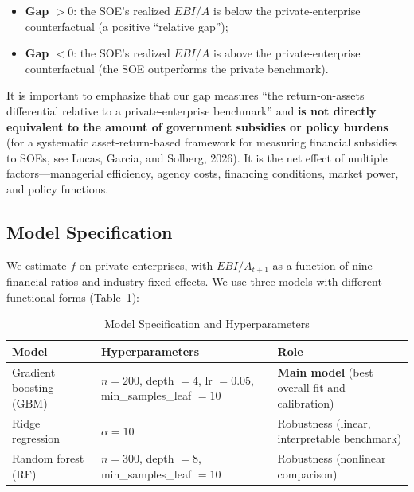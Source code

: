 \documentclass[11pt,a4paper]{article}
\begin{document}
\begin{itemize}[leftmargin=2em,itemsep=0pt]
\item \textbf{Gap $>0$}: the SOE's realized $EBI/A$ is below the private-enterprise counterfactual (a positive ``relative gap'');
\item \textbf{Gap $<0$}: the SOE's realized $EBI/A$ is above the private-enterprise counterfactual (the SOE outperforms the private benchmark).
\end{itemize}

It is important to emphasize that our gap measures ``the return-on-assets differential relative to a private-enterprise benchmark'' and \textbf{is not directly equivalent to the amount of government subsidies or policy burdens} (for a systematic asset-return-based framework for measuring financial subsidies to SOEs, see Lucas, Garcia, and Solberg, 2026). It is the net effect of multiple factors---managerial efficiency, agency costs, financing conditions, market power, and policy functions.

\subsection{Model Specification}

We estimate $f$ on private enterprises, with $EBI/A_{t+1}$ as a function of nine financial ratios and industry fixed effects. We use three models with different functional forms (Table~\ref{tab:models}):

\begin{table}[htbp]
\centering
\caption{Model Specification and Hyperparameters}
\label{tab:models}
\begin{threeparttable}
\small
\begin{tabularx}{\linewidth}{l >{\raggedright\arraybackslash}X >{\raggedright\arraybackslash}X}
\toprule
Model & Hyperparameters & Role \\
\midrule
Gradient boosting (GBM) & $n=200$, depth $=4$, lr $=0.05$, min\_samples\_leaf $=10$ & \textbf{Main model} (best overall fit and calibration) \\
Ridge regression & $\alpha=10$ & Robustness (linear, interpretable benchmark) \\
Random forest (RF) & $n=300$, depth $=8$, min\_samples\_leaf $=10$ & Robustness (nonlinear comparison) \\
\bottomrule
\end{tabularx}
\end{threeparttable}
\end{table}
\end{document}
